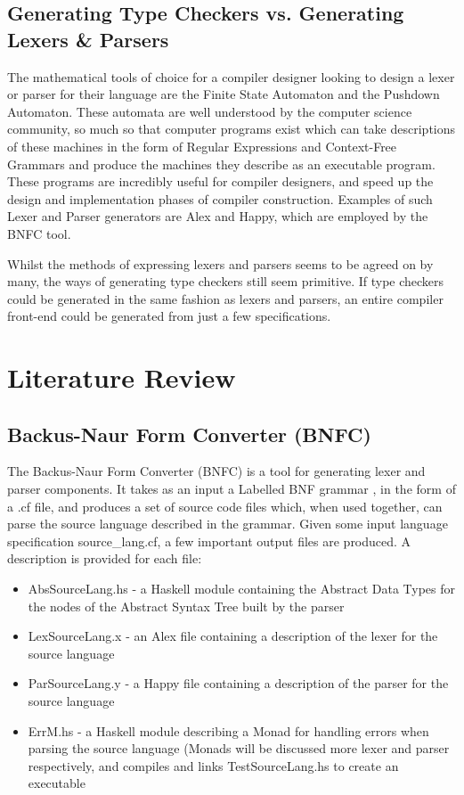 \documentclass{UoYCSproject}
\begin{document}
\section{Generating Type Checkers vs. Generating Lexers \& Parsers}
The mathematical tools of choice for a compiler designer looking to design
a lexer or parser for their language are the Finite State Automaton and the
Pushdown Automaton. These automata are well understood by the computer science
community, so much so that computer programs exist which can take descriptions
of these machines in the form of Regular Expressions and Context-Free Grammars
and produce the machines they describe as an executable program. These programs
are incredibly useful for compiler designers, and speed up the design and
implementation phases of compiler construction. Examples of such Lexer and Parser
generators are Alex and Happy, which are employed by the BNFC tool.

Whilst the methods of expressing lexers and parsers seems to be agreed on by
many, the ways of generating type checkers still seem primitive. If type checkers
could be generated in the same fashion as lexers and parsers, an entire compiler
front-end could be generated from just a few specifications.

\chapter{Literature Review}

\section{Backus-Naur Form Converter (BNFC)}
\label{sec:BNFC}

The Backus-Naur Form Converter (BNFC) is a tool for generating lexer and parser
components. It takes as an input a Labelled BNF grammar \cite{LBNFReport},
in the form of a {\ttfamily .cf} file, and produces a set of source code files
which, when used together, can parse the source language described in the
grammar. Given some input language specification {\ttfamily source\_lang.cf},
a few important output files are produced. A description is provided for each
file:
\begin{itemize}
    \item {\ttfamily AbsSourceLang.hs} - a Haskell module containing the Abstract
        Data Types for the nodes of the Abstract Syntax Tree built by the
        parser
    \item {\ttfamily LexSourceLang.x} - an Alex file containing a description
        of the lexer for the source language
    \item {\ttfamily ParSourceLang.y} - a Happy file containing a description
        of the parser for the source language
    \item {\ttfamily ErrM.hs} - a Haskell module describing a Monad for handling
        errors when parsing the source language (Monads will be discussed more
        lexer and parser respectively, and compiles and links TestSourceLang.hs
        to create an executable
\end{itemize}
\end{document}
